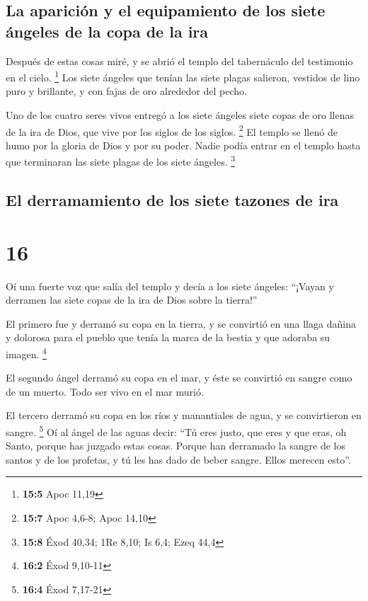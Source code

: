 \hypertarget{la-apariciuxf3n-y-el-equipamiento-de-los-siete-uxe1ngeles-de-la-copa-de-la-ira}{%
\subsection{La aparición y el equipamiento de los siete ángeles de la
copa de la
ira}\label{la-apariciuxf3n-y-el-equipamiento-de-los-siete-uxe1ngeles-de-la-copa-de-la-ira}}

 Después de estas cosas miré, y se abrió el templo del
tabernáculo del testimonio en el cielo. \footnote{\textbf{15:5} Apoc
  11,19}  Los siete ángeles que tenían las siete plagas
salieron, vestidos de lino puro y brillante, y con fajas de oro
alrededor del pecho.

 Uno de los cuatro seres vivos entregó a los siete ángeles
siete copas de oro llenas de la ira de Dios, que vive por los siglos de
los siglos. \footnote{\textbf{15:7} Apoc 4,6-8; Apoc 14,10}
 El templo se llenó de humo por la gloria de Dios y por su
poder. Nadie podía entrar en el templo hasta que terminaran las siete
plagas de los siete ángeles. \footnote{\textbf{15:8} Éxod 40,34; 1Re
  8,10; Is 6,4; Ezeq 44,4}

\hypertarget{el-derramamiento-de-los-siete-tazones-de-ira}{%
\subsection{El derramamiento de los siete tazones de
ira}\label{el-derramamiento-de-los-siete-tazones-de-ira}}

\hypertarget{section-15}{%
\section{16}\label{section-15}}

 Oí una fuerte voz que salía del templo y decía a los
siete ángeles: ``¡Vayan y derramen las siete copas de la ira de Dios
sobre la tierra!''

 El primero fue y derramó su copa en la tierra, y se
convirtió en una llaga dañina y dolorosa para el pueblo que tenía la
marca de la bestia y que adoraba su imagen. \footnote{\textbf{16:2} Éxod
  9,10-11}

 El segundo ángel derramó su copa en el mar, y éste se
convirtió en sangre como de un muerto. Todo ser vivo en el mar murió.

 El tercero derramó su copa en los ríos y manantiales de
agua, y se convirtieron en sangre. \footnote{\textbf{16:4} Éxod 7,17-21}
 Oí al ángel de las aguas decir: ``Tú eres justo, que eres
y que eras, oh Santo, porque has juzgado estas cosas. 
Porque han derramado la sangre de los santos y de los profetas, y tú les
has dado de beber sangre. Ellos merecen esto''.

